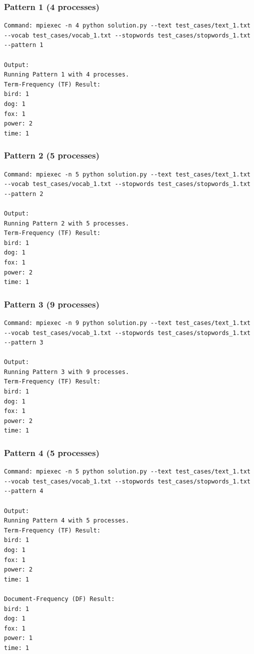 \documentclass[12pt,a4paper]{article}
\begin{document}
\subsubsection{Pattern 1 (4 processes)}
\begin{lstlisting}
Command: mpiexec -n 4 python solution.py --text test_cases/text_1.txt --vocab test_cases/vocab_1.txt --stopwords test_cases/stopwords_1.txt --pattern 1

Output:
Running Pattern 1 with 4 processes.
Term-Frequency (TF) Result:
bird: 1
dog: 1
fox: 1
power: 2
time: 1
\end{lstlisting}

\subsubsection{Pattern 2 (5 processes)}
\begin{lstlisting}
Command: mpiexec -n 5 python solution.py --text test_cases/text_1.txt --vocab test_cases/vocab_1.txt --stopwords test_cases/stopwords_1.txt --pattern 2

Output:
Running Pattern 2 with 5 processes.
Term-Frequency (TF) Result:
bird: 1
dog: 1
fox: 1
power: 2
time: 1
\end{lstlisting}

\subsubsection{Pattern 3 (9 processes)}
\begin{lstlisting}
Command: mpiexec -n 9 python solution.py --text test_cases/text_1.txt --vocab test_cases/vocab_1.txt --stopwords test_cases/stopwords_1.txt --pattern 3

Output:
Running Pattern 3 with 9 processes.
Term-Frequency (TF) Result:
bird: 1
dog: 1
fox: 1
power: 2
time: 1
\end{lstlisting}

\subsubsection{Pattern 4 (5 processes)}
\begin{lstlisting}
Command: mpiexec -n 5 python solution.py --text test_cases/text_1.txt --vocab test_cases/vocab_1.txt --stopwords test_cases/stopwords_1.txt --pattern 4

Output:
Running Pattern 4 with 5 processes.
Term-Frequency (TF) Result:
bird: 1
dog: 1
fox: 1
power: 2
time: 1

Document-Frequency (DF) Result:
bird: 1
dog: 1
fox: 1
power: 1
time: 1
\end{lstlisting}
\end{document}
